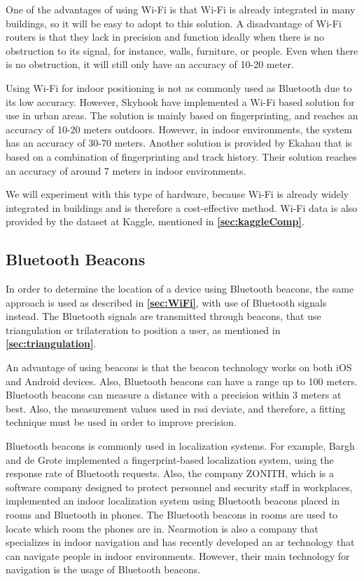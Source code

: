 One of the advantages of using Wi-Fi is that Wi-Fi is already integrated in many buildings, so it will be easy to adopt to this solution.
A disadvantage of Wi-Fi routers is that they lack in precision and function ideally when there is no obstruction to its signal, for instance, walls, furniture, or people. Even when there is no obstruction, it will still only have an accuracy of 10-20 meter.\cite{oriient}

Using Wi-Fi for indoor positioning is not as commonly used as Bluetooth due to its low accuracy. However, Skyhook have implemented a Wi-Fi based solution for use in urban areas\cite{skyhook}. The solution is mainly based on fingerprinting, and reaches an accuracy of 10-20 meters outdoors. However, in indoor environments, the system has an accuracy of 30-70 meters. Another solution is provided by Ekahau that is based on a combination of fingerprinting and track history. Their solution reaches an accuracy of around 7 meters in indoor environments.\cite{HabilitationThesis}

We will experiment with this type of hardware, because Wi-Fi is already widely integrated in buildings and is therefore a cost-effective method. Wi-Fi data is also provided by the dataset at Kaggle, mentioned in \textbf{\autoref{sec:kaggleComp}}.

\subsection{Bluetooth Beacons}
In order to determine the location of a device using Bluetooth beacons, the same approach is used as described in \textbf{\autoref{sec:WiFi}}, with use of Bluetooth signals instead. The Bluetooth signals are transmitted through beacons, that use triangulation or trilateration to position a user, as mentioned in \textbf{\autoref{sec:triangulation}}.

An advantage of using beacons is that the beacon technology works on both iOS and Android devices.
Also, Bluetooth beacons can have a range up to 100 meters\cite{8419192}.
Bluetooth beacons can measure a distance with a precision within 3 meters at best.\cite{BluetoothBeacons} Also, the measurement values used in \gls{rssi} deviate, and therefore, a fitting technique must be used in order to improve precision\cite{RSSIWiFiDistance}.

Bluetooth beacons is commonly used in localization systems. For example, Bargh and de Grote implemented a fingerprint-based localization system, using the response rate of Bluetooth requests.\cite{HabilitationThesis} Also, the company ZONITH, which is a software company designed to protect personnel and security staff in workplaces\cite{zonith}, implemented an indoor localization system using Bluetooth beacons placed in rooms and Bluetooth in phones. The Bluetooth beacons in rooms are used to locate which room the phones are in.\cite{HabilitationThesis}
Nearmotion is also a company that specializes in indoor navigation and has recently developed an \gls{ar} technology that can navigate people in indoor environments. However, their main technology for navigation is the usage of Bluetooth beacons.\cite{nearmotion}

